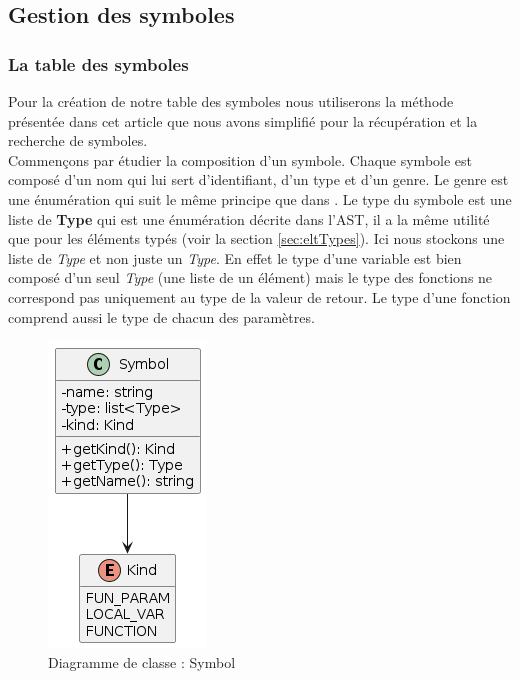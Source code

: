 \documentclass[a4paper]{article}%
\begin{document}
\subsection{Gestion des symboles}

\subsubsection*{La table des symboles}

Pour la création de notre table des symboles nous utiliserons la méthode
présentée dans cet article \cite{power2000symbol} que nous avons simplifié pour
la récupération et la recherche de symboles.\\

Commençons par étudier la composition d'un symbole. Chaque symbole est composé
d'un nom qui lui sert d'identifiant, d'un type et d'un genre. Le genre est une
énumération qui suit le même principe que dans \cite{power2000symbol}. Le type
du symbole est une liste de \textbf{Type} qui est une énumération décrite dans
l'AST, il a la même utilité que pour les éléments typés (voir la section
\ref{sec:eltTypes}). Ici nous stockons une liste de \textit{Type} et non
juste un \textit{Type}. En effet le type d'une variable est bien composé d'un
seul \textit{Type} (une liste de un élément) mais le type des fonctions ne
correspond pas uniquement au type de la valeur de retour. Le type d'une fonction
comprend aussi le type de chacun des paramètres.

\begin{figure}[h!]
  \begin{center}
  \includegraphics[scale=0.5]{../ressources/diagrams/symbol.png}
  \caption{Diagramme de classe : Symbol}
  \end{center}
\end{figure}
\end{document}
